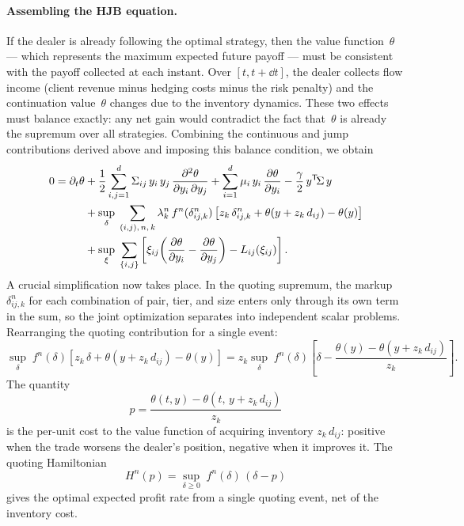 \paragraph{Assembling the HJB equation.}
If the dealer is already following the optimal strategy, then the value function~$\theta$ --- which represents the maximum expected future payoff --- must be consistent with the payoff collected at each instant. Over $[t, t + \dd t]$, the dealer collects flow income (client revenue minus hedging costs minus the risk penalty) and the continuation value~$\theta$ changes due to the inventory dynamics. These two effects must balance exactly: any net gain would contradict the fact that~$\theta$ is already the supremum over all strategies. Combining the continuous and jump contributions derived above and imposing this balance condition, we obtain
\begin{align}
  0 = \partial_t\theta &+ \frac{1}{2}\sum_{i,j=1}^d \Sigma_{ij}\,y_i\,y_j\,\frac{\partial^2\theta}{\partial y_i\,\partial y_j} + \sum_{i=1}^d \mu_i\,y_i\,\frac{\partial\theta}{\partial y_i} - \frac{\gamma}{2}\,y^{\mathsf{T}}\!\Sigma\,y \notag\\
  &+ \sup_{\delta}\;\sum_{(i,j),\,n,\,k} \lambda^n_k\,f^n(\delta^n_{ij,k})\left[z_k\,\delta^n_{ij,k} + \theta(y + z_k\,d_{ij}) - \theta(y)\right] \notag\\
  &+ \sup_{\xi}\;\sum_{\{i,j\}}\left[\xi_{ij}\!\left(\frac{\partial\theta}{\partial y_i} - \frac{\partial\theta}{\partial y_j}\right) - L_{ij}(\xi_{ij})\right]. \label{eq:hjb-raw}
\end{align}
A crucial simplification now takes place. In the quoting supremum, the markup $\delta^n_{ij,k}$ for each combination of pair, tier, and size enters only through its own term in the sum, so the joint optimization separates into independent scalar problems. Rearranging the quoting contribution for a single event:
\[
  \sup_{\delta}\; f^n(\delta)\left[z_k\,\delta + \theta(y + z_k\,d_{ij}) - \theta(y)\right] = z_k\sup_{\delta}\; f^n(\delta)\!\left[\delta - \frac{\theta(y) - \theta(y + z_k\,d_{ij})}{z_k}\right].
\]
The quantity
\begin{equation}
  \label{eq:quoting-momentum}
  p = \frac{\theta(t,y) - \theta(t,\,y + z_k\,d_{ij})}{z_k}
\end{equation}
is the per-unit cost to the value function of acquiring inventory $z_k\,d_{ij}$: positive when the trade worsens the dealer's position, negative when it improves it. The quoting Hamiltonian
\begin{equation}
  \label{eq:quoting-hamiltonian}
  H^n(p) = \sup_{\delta \geq 0}\; f^n(\delta)\,(\delta - p)
\end{equation}
gives the optimal expected profit rate from a single quoting event, net of the inventory cost.

